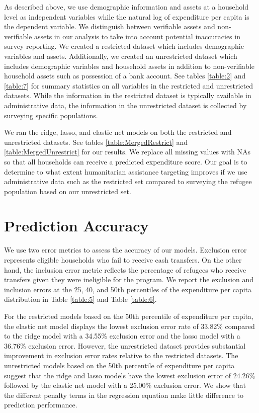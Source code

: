 \documentclass{article}
\begin{document}
As described above, we use demographic information and assets at a household level as independent variables while the natural log of expenditure per capita is the dependent variable. We distinguish between verifiable assets and non-verifiable assets in our analysis to take into account potential inaccuracies in survey reporting. We created a restricted dataset which includes demographic variables and assets. Additionally, we created an unrestricted dataset which includes demographic variables and household assets in addition to non-verifiable household assets such as possession of a bank account. See tables \ref{table:2} and \ref{table:7} for summary statistics on all variables in the restricted and unrestricted datasets. While the information in the restricted dataset is typically available in administrative data, the information in the unrestricted dataset is collected by surveying specific populations.

 

We ran the ridge, lasso, and elastic net models on both the restricted and unrestricted datasets. See tables \ref{table:MergedRestrict} and \ref{table:MergedUnrestrict} for our results. We replace all missing values with NAs so that all households can receive a predicted expenditure score. Our goal is to determine to what extent humanitarian assistance targeting improves if we use administrative data such as the restricted set compared to surveying the refugee population based on our unrestricted set. 

\section{Prediction Accuracy}

We use two error metrics to assess the accuracy of our models. Exclusion error represents eligible households who fail to receive cash transfers. On the other hand, the inclusion error metric reflects the percentage of refugees who receive transfers given they were ineligible for the program. We report the exclusion and inclusion errors at the 25, 40, and 50th percentiles of the expenditure per capita distribution in Table \ref{table:5} and Table \ref{table:6}. 




For the restricted models based on the 50th percentile of expenditure per capita, the elastic net model displays the lowest exclusion error rate of 33.82\% compared to the ridge model with a 34.55\% exclusion error and the lasso model with a 36.76\% exclusion error. However, the unrestricted dataset provides substantial improvement in exclusion error rates relative to the restricted datasets. The unrestricted models based on the 50th percentile of expenditure per capita suggest that the ridge and lasso models have the lowest exclusion error of 24.26\% followed by the elastic net model with a 25.00\%  exclusion error. We show that the different penalty terms in the regression equation make little difference to prediction performance. 
\end{document}
